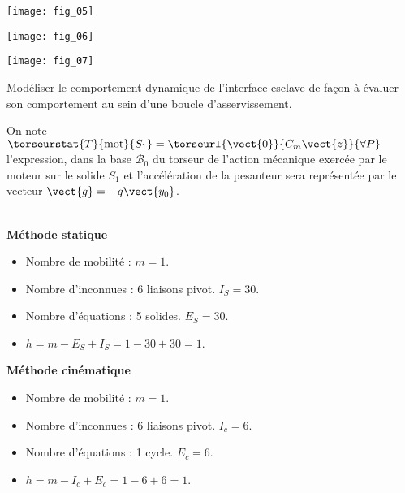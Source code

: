 \begin{marginfigure}
\texttt{[image: fig\_05]}
\end{marginfigure}

\begin{center}
\texttt{[image: fig\_06]}
\end{center}

\begin{center}
\texttt{[image: fig\_07]}
\end{center}

\fi

\begin{obj}
Modéliser le comportement dynamique de l’interface esclave de façon à évaluer son
comportement au sein d’une boucle d’asservissement.
\end{obj}

\ifprof
\else

On note $\torseurstat{T}{\text{mot}}{S_1}=\torseurl{\vect{0}}{C_m\vect{z}}{\forall P}$ l’expression, dans la base $\mathcal{B}_0$ du torseur de l’action mécanique exercée par le moteur sur le solide $S_1$ et
l’accélération de la pesanteur sera représentée par le vecteur $\vect{g} = -g \vect{y_0}$.

\fi
{}
\ifprof
\begin{corrige}~\\

\textbf{Méthode statique}
\begin{itemize}
\item Nombre de mobilité : $m=1$.
\item Nombre d'inconnues : 6 liaisons pivot. $I_S=30$. 
\item Nombre d'équations : 5 solides. $E_S = 30$. 
\item $h=m-E_S+I_S = 1-30+30=1$. 
\end{itemize}

\textbf{Méthode cinématique}

\begin{itemize}
\item Nombre de mobilité : $m=1$.
\item Nombre d'inconnues : 6 liaisons pivot. $I_c=6$. 
\item Nombre d'équations : 1 cycle. $E_c = 6$. 
\item $h=m-I_c+E_c = 1-6+6=1$. 
\end{itemize}

\end{corrige}
\else
\fi


